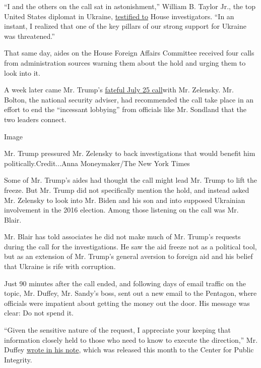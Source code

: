``I and the others on the call sat in astonishment,'' William B. Taylor
Jr., the top United States diplomat in Ukraine,
\href{https://www.documentcloud.org/documents/6593140-2019-10-22-William-Taylor-Testimony.html\#document/p27/a541464}{testified
to} House investigators. ``In an instant, I realized that one of the key
pillars of our strong support for Ukraine was threatened.''

That same day, aides on the House Foreign Affairs Committee received
four calls from administration sources warning them about the hold and
urging them to look into it.

A week later came Mr. Trump's
\href{https://www.nytimes.com/2019/11/19/us/politics/trump-impeachment-hearing-testimony.html}{fateful
July 25 call}with Mr. Zelensky. Mr. Bolton, the national security
adviser, had recommended the call take place in an effort to end the
``incessant lobbying'' from officials like Mr. Sondland that the two
leaders connect.

Image

Mr. Trump pressured Mr. Zelensky to back investigations that would
benefit him politically.Credit...Anna Moneymaker/The New York Times

Some of Mr. Trump's aides had thought the call might lead Mr. Trump to
lift the freeze. But Mr. Trump did not specifically mention the hold,
and instead asked Mr. Zelensky to look into Mr. Biden and his son and
into supposed Ukrainian involvement in the 2016 election. Among those
listening on the call was Mr. Blair.

Mr. Blair has told associates he did not make much of Mr. Trump's
requests during the call for the investigations. He saw the aid freeze
not as a political tool, but as an extension of Mr. Trump's general
aversion to foreign aid and his belief that Ukraine is rife with
corruption.

Just 90 minutes after the call ended, and following days of email
traffic on the topic, Mr. Duffey, Mr. Sandy's boss, sent out a new email
to the Pentagon, where officials were impatient about getting the money
out the door. His message was clear: Do not spend it.

``Given the sensitive nature of the request, I appreciate your keeping
that information closely held to those who need to know to execute the
direction,'' Mr. Duffey
\href{https://www.documentcloud.org/documents/6592561-2019-07-25-Duffey-Email-Re-Hold-CPI-v-DoD-Dec-20.html}{wrote
in his note}, which was released this month to the Center for Public
Integrity.

